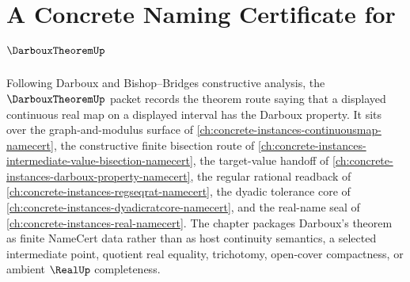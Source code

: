 \chapter{A Concrete Naming Certificate for $\DarbouxTheoremUp$}
\label{ch:concrete-instances-darboux-theorem-namecert}

Following Darboux and Bishop--Bridges constructive analysis, the $\DarbouxTheoremUp$ packet records the theorem route saying that a displayed continuous real map on a displayed interval has the Darboux property. It sits over the graph-and-modulus surface of \autoref{ch:concrete-instances-continuousmap-namecert}, the constructive finite bisection route of \autoref{ch:concrete-instances-intermediate-value-bisection-namecert}, the target-value handoff of \autoref{ch:concrete-instances-darboux-property-namecert}, the regular rational readback of \autoref{ch:concrete-instances-regseqrat-namecert}, the dyadic tolerance core of \autoref{ch:concrete-instances-dyadicratcore-namecert}, and the real-name seal of \autoref{ch:concrete-instances-real-namecert}. The chapter packages Darboux's theorem as finite NameCert data rather than as host continuity semantics, a selected intermediate point, quotient real equality, trichotomy, open-cover compactness, or ambient $\RealUp$ completeness.

